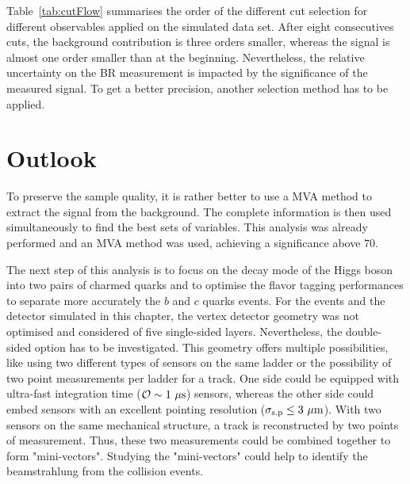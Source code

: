   Table~\ref{tab:cutFlow} summarises the order of the different cut selection for different observables applied on the simulated data set.
  After eight consecutives cuts, the background contribution is three orders smaller, whereas the signal is almost one order smaller than at the beginning.
  Nevertheless, the relative uncertainty on the \gls{BR} measurement is impacted by the significance of the measured signal.
  To get a better precision, another selection method has to be applied.

  \section{Outlook}

  To preserve the sample quality, it is rather better to use a \gls{MVA} method to extract the signal from the background.
  The complete information is then used simultaneously to find the best sets of variables.
  This analysis was already performed and an \gls{MVA} method was used, achieving a significance above $70$.

  The next step of this analysis is to focus on the decay mode of the Higgs boson into two pairs of charmed quarks and to optimise the flavor tagging performances to separate more accurately the $b$ and $c$ quarks events.
  For the events and the detector simulated in this chapter, the vertex detector geometry was not optimised and considered of five single-sided layers.
  Nevertheless, the double-sided option has to be investigated.
  This geometry offers multiple possibilities, like using two different types of sensors on the same ladder or the possibility of two point measurements per ladder for a track.
  One side could be equipped with ultra-fast integration time ($\mathcal{O} \sim 1~\rm{\mu s}$) sensors, whereas the other side could embed sensors with an excellent pointing resolution ($\sigma_{\rm{s.p}} \leq 3~\rm{\mu m}$).
  With two sensors on the same mechanical structure, a track is reconstructed by two points of measurement.
  Thus, these two measurements could be combined together to form "mini-vectors".
  Studying the "mini-vectors" could help to identify the beamstrahlung from the collision events.

